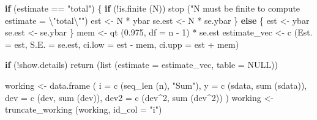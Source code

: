 \documentclass[
  letterpaper,
  DIV=11,
  numbers=noendperiod]{scrreprt}
\newenvironment{Shaded}{\begin{snugshade}}{\end{snugshade}}
\newcommand{\AttributeTok}[1]{\textcolor[rgb]{0.40,0.45,0.13}{#1}}
\newcommand{\ConstantTok}[1]{\textcolor[rgb]{0.56,0.35,0.01}{#1}}
\newcommand{\ControlFlowTok}[1]{\textcolor[rgb]{0.00,0.23,0.31}{\textbf{#1}}}
\newcommand{\DecValTok}[1]{\textcolor[rgb]{0.68,0.00,0.00}{#1}}
\newcommand{\FloatTok}[1]{\textcolor[rgb]{0.68,0.00,0.00}{#1}}
\newcommand{\FunctionTok}[1]{\textcolor[rgb]{0.28,0.35,0.67}{#1}}
\newcommand{\NormalTok}[1]{\textcolor[rgb]{0.00,0.23,0.31}{#1}}
\newcommand{\OtherTok}[1]{\textcolor[rgb]{0.00,0.23,0.31}{#1}}
\newcommand{\SpecialCharTok}[1]{\textcolor[rgb]{0.37,0.37,0.37}{#1}}
\newcommand{\StringTok}[1]{\textcolor[rgb]{0.13,0.47,0.30}{#1}}
\renewcommand{\[}{\begin{equation}}
\renewcommand{\]}{\end{equation}}
\begin{document}
\begin{Shaded}
\begin{Highlighting}[]
    \ControlFlowTok{if}\NormalTok{ (estimate }\SpecialCharTok{==} \StringTok{"total"}\NormalTok{)}
\NormalTok{    \{}
        \ControlFlowTok{if}\NormalTok{ (}\SpecialCharTok{!}\FunctionTok{is.finite}\NormalTok{ (N))}
            \FunctionTok{stop}\NormalTok{ (}\StringTok{"N must be finite to compute estimate = }\SpecialCharTok{\textbackslash{}"}\StringTok{total}\SpecialCharTok{\textbackslash{}"}\StringTok{"}\NormalTok{)}
\NormalTok{        est }\OtherTok{\textless{}{-}}\NormalTok{ N }\SpecialCharTok{*}\NormalTok{ ybar}
\NormalTok{        se.est }\OtherTok{\textless{}{-}}\NormalTok{ N }\SpecialCharTok{*}\NormalTok{ se.ybar}
\NormalTok{    \}}
    \ControlFlowTok{else}
\NormalTok{    \{}
\NormalTok{        est }\OtherTok{\textless{}{-}}\NormalTok{ ybar}
\NormalTok{        se.est }\OtherTok{\textless{}{-}}\NormalTok{ se.ybar}
\NormalTok{    \}}
\NormalTok{    mem }\OtherTok{\textless{}{-}} \FunctionTok{qt}\NormalTok{ (}\FloatTok{0.975}\NormalTok{, }\AttributeTok{df =}\NormalTok{ n }\SpecialCharTok{{-}} \DecValTok{1}\NormalTok{) }\SpecialCharTok{*}\NormalTok{ se.est}
\NormalTok{    estimate\_vec }\OtherTok{\textless{}{-}} \FunctionTok{c}\NormalTok{ (}\AttributeTok{Est. =}\NormalTok{ est, }\AttributeTok{S.E. =}\NormalTok{ se.est, }\AttributeTok{ci.low =}\NormalTok{ est }\SpecialCharTok{{-}}\NormalTok{ mem, }\AttributeTok{ci.upp =}\NormalTok{ est }\SpecialCharTok{+}\NormalTok{ mem)}

    \ControlFlowTok{if}\NormalTok{ (}\SpecialCharTok{!}\NormalTok{show.details)}
        \FunctionTok{return}\NormalTok{ (}\FunctionTok{list}\NormalTok{ (}\AttributeTok{estimate =}\NormalTok{ estimate\_vec, }\AttributeTok{table =} \ConstantTok{NULL}\NormalTok{))}

\NormalTok{    working }\OtherTok{\textless{}{-}} \FunctionTok{data.frame}\NormalTok{ (}
        \AttributeTok{i    =} \FunctionTok{c}\NormalTok{ (}\FunctionTok{seq\_len}\NormalTok{ (n), }\StringTok{"Sum"}\NormalTok{),}
        \AttributeTok{y    =} \FunctionTok{c}\NormalTok{ (sdata, }\FunctionTok{sum}\NormalTok{ (sdata)),}
        \AttributeTok{dev  =} \FunctionTok{c}\NormalTok{ (dev, }\FunctionTok{sum}\NormalTok{ (dev)),}
        \AttributeTok{dev2 =} \FunctionTok{c}\NormalTok{ (dev}\SpecialCharTok{\^{}}\DecValTok{2}\NormalTok{, }\FunctionTok{sum}\NormalTok{ (dev}\SpecialCharTok{\^{}}\DecValTok{2}\NormalTok{))}
\NormalTok{    )}
\NormalTok{    working }\OtherTok{\textless{}{-}} \FunctionTok{truncate\_working}\NormalTok{ (working, }\AttributeTok{id\_col =} \StringTok{"i"}\NormalTok{)}


\end{Highlighting}
\end{Shaded}
\end{document}
